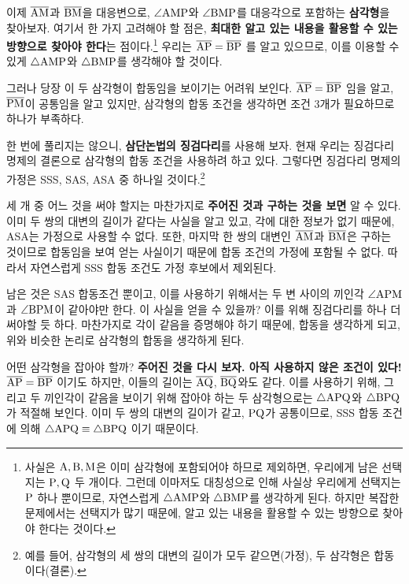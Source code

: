 이제 \(\overline{\rm{AM}}\)과 \(\overline{\rm{BM}}\)을 대응변으로, \(\angle \rm{AMP}\)와 \(\angle \rm{BMP}\)를 대응각으로 포함하는 \textbf{삼각형}을 찾아보자. 여기서 한 가지 고려해야 할 점은, \textbf{최대한 알고 있는 내용을 활용할 수 있는 방향으로 찾아야 한다}는 점이다.\footnote{사실은 \(\rm{A}, \rm{B}, \rm{M}\)은 이미 삼각형에 포함되어야 하므로 제외하면, 우리에게 남은 선택지는 \(\rm{P}, \rm{Q}\) 두 개이다. 그런데 이마저도 대칭성으로 인해 사실상 우리에게 선택지는 \(\rm{P}\) 하나 뿐이므로, 자연스럽게 \(\triangle \rm{AMP}\)와 \(\triangle \rm{BMP}\)를 생각하게 된다. 하지만 복잡한 문제에서는 선택지가 많기 때문에, 알고 있는 내용을 활용할 수 있는 방향으로 찾아야 한다는 것이다.} 우리는 \(\overline{\rm{AP}} = \overline{\rm{BP}}\) 를 알고 있으므로, 이를 이용할 수 있게 \(\triangle \rm{AMP}\)와 \(\triangle \rm{BMP}\)를 생각해야 할 것이다.

그러나 당장 이 두 삼각형이 합동임을 보이기는 어려워 보인다. \(\overline{\rm{AP}} = \overline{\rm{BP}}\) 임을 알고, \(\overline{\rm{PM}}\)이 공통임을 알고 있지만, 삼각형의 합동 조건을 생각하면 조건 3개가 필요하므로 하나가 부족하다.

한 번에 풀리지는 않으니, \textbf{삼단논법의 징검다리}를 사용해 보자. 현재 우리는 징검다리 명제의 결론으로 삼각형의 합동 조건을 사용하려 하고 있다. 그렇다면 징검다리 명제의 가정은 SSS, SAS, ASA 중 하나일 것이다.\footnote{예를 들어, 삼각형의 세 쌍의 대변의 길이가 모두 같으면(가정), 두 삼각형은 합동이다(결론).}

세 개 중 어느 것을 써야 할지는 마찬가지로 \textbf{주어진 것과 구하는 것을 보면} 알 수 있다. 이미 두 쌍의 대변의 길이가 같다는 사실을 알고 있고, 각에 대한 정보가 없기 때문에, ASA는 가정으로 사용할 수 없다. 또한, 마지막 한 쌍의 대변인 \(\overline{\rm{AM}}\)과 \(\overline{\rm{BM}}\)은 구하는 것이므로 합동임을 보여 얻는 사실이기 때문에 합동 조건의 가정에 포함될 수 없다. 따라서 자연스럽게 SSS 합동 조건도 가정 후보에서 제외된다.

남은 것은 SAS 합동조건 뿐이고, 이를 사용하기 위해서는 두 변 사이의 끼인각 \(\angle \rm{APM}\)과 \(\angle \rm{BPM}\)이 같아야만 한다. 이 사실을 얻을 수 있을까? 이를 위해 징검다리를 하나 더 써야할 듯 하다. 마찬가지로 각이 같음을 증명해야 하기 때문에, 합동을 생각하게 되고, 위와 비슷한 논리로 삼각형의 합동을 생각하게 된다.

어떤 삼각형을 잡아야 할까? \textbf{주어진 것을 다시 보자. 아직 사용하지 않은 조건이 있다!} \(\overline{\rm{AP}} = \overline{\rm{BP}}\) 이기도 하지만, 이들의 길이는 \(\overline{\rm{AQ}}\), \(\overline{\rm{BQ}}\)와도 같다. 이를 사용하기 위해, 그리고 두 끼인각이 같음을 보이기 위해 잡아야 하는 두 삼각형으로는 \(\triangle \rm{APQ}\)와 \(\triangle \rm{BPQ}\)가 적절해 보인다. 이미 두 쌍의 대변의 길이가 같고, \(\rm{PQ}\)가 공통이므로, SSS 합동 조건에 의해 \(\triangle \rm{APQ} \equiv \triangle BPQ\) 이기 때문이다.

